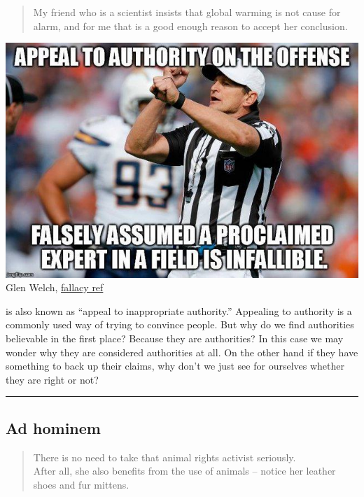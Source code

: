 \documentclass[justified]{tufte-book}
\newenvironment{argument}{\begin{quote}\normalsize}{\end{quote}}
\begin{document}
\begin{argument}
My friend who is a scientist insists that global warming is not cause
for alarm, and for me that is a good enough reason to accept her
conclusion.
\end{argument}

\begin{marginfigure}
\includegraphics{img/fallacies/authority.jpg}\\
Glen Welch, \href{https://twitter.com/fallacy_ref?lang=en}{fallacy ref}
\end{marginfigure}

 is also known as ``appeal to inappropriate authority.'' Appealing to authority is a commonly used way of trying to convince people. But why do we find authorities believable in the first place? Because they are authorities? In this case we may wonder why they are considered authorities at all. On the other hand if they have something to back up their claims, why don't we just see for ourselves whether they are right or not?

\begin{center}\rule{0.5\linewidth}{\linethickness}\end{center}

\hypertarget{ad-hominem}{%
\subsection*{Ad hominem}\label{ad-hominem}}

\begin{argument}
There is no need to take that animal rights activist seriously.\\
After all, she also benefits from the use of animals -- notice her
leather shoes and fur mittens.
\end{argument}
\end{document}
